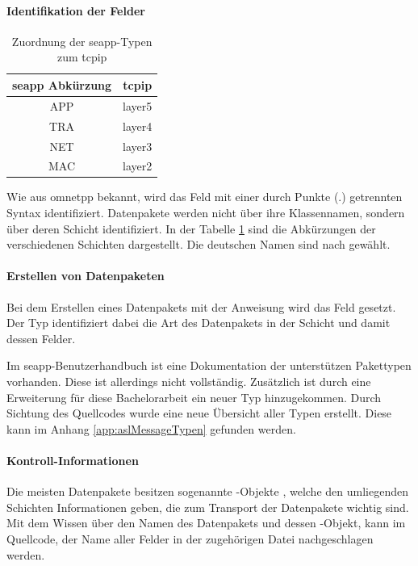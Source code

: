 \paragraph{Identifikation der Felder}
\begin{table}[ht]
	\centering
	\begin{tabular}{|c|c|}
		\hline
		\rowcolor{Gainsboro!60}
		\gls{seapp} Abkürzung & \gls{tcpip}   \\ \hline
		                      APP                       &      \gls{layer5}      \\ \hline
		                      TRA                       &      \gls{layer4}      \\ \hline
		                      NET                       &      \gls{layer3}      \\ \hline
		                      MAC                       &      \gls{layer2}      \\ \hline
	\end{tabular}
	\caption[Schichtenzuordnung]{Zuordnung der \gls{seapp}-Typen zum \gls{tcpip}}
	\label{table:seaSchichtenZuordnung}
\end{table}
Wie aus \gls{omnetpp} bekannt, wird das Feld  mit einer durch Punkte (.) getrennten Syntax identifiziert. Datenpakete werden nicht über ihre Klassennamen, sondern über deren Schicht identifiziert. In der Tabelle \ref{table:seaSchichtenZuordnung} sind die Abkürzungen der verschiedenen Schichten dargestellt. Die deutschen Namen sind nach  \cite{Kurose02} gewählt.

\paragraph{Erstellen von Datenpaketen}
Bei dem Erstellen eines Datenpakets mit der Anweisung  wird das Feld  gesetzt. Der Typ  identifiziert dabei die Art des Datenpakets in der Schicht  und damit dessen Felder. 

Im \gls{seapp}-Benutzerhandbuch \cite[]{SEAManual} ist eine Dokumentation der unterstützen Pakettypen vorhanden. Diese ist allerdings nicht vollständig. Zusätzlich ist durch eine Erweiterung für diese Bachelorarbeit ein neuer Typ  hinzugekommen. Durch Sichtung des Quellcodes wurde eine neue Übersicht aller Typen erstellt. Diese kann im Anhang \ref{app:aslMessageTypen} gefunden werden.

\paragraph{Kontroll-Informationen}
Die meisten Datenpakete besitzen sogenannte -Objekte \cite[]{OmnetManual}, welche den umliegenden Schichten Informationen geben, die zum Transport der Datenpakete wichtig sind. Mit dem Wissen über den Namen des Datenpakets und dessen -Objekt, kann im Quellcode, der Name aller Felder in der zugehörigen  Datei nachgeschlagen werden.

